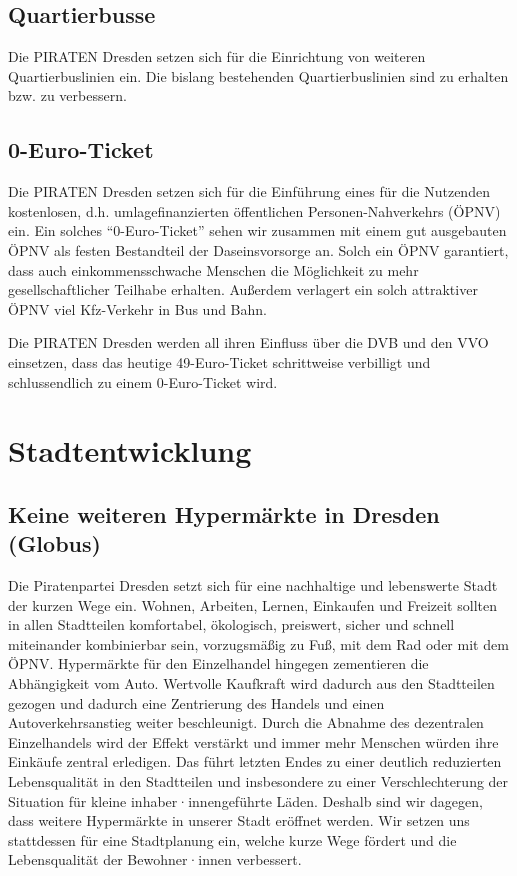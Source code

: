 \documentclass[a4paper, 11pt]{article}
\begin{document}
\subsection{Quartierbusse}
Die PIRATEN Dresden setzen sich für die Einrichtung von weiteren Quartierbuslinien ein. Die bislang bestehenden Quartierbuslinien sind zu erhalten bzw. zu verbessern.



\subsection{0-Euro-Ticket}
Die PIRATEN Dresden setzen sich für die Einführung eines für die Nutzenden kostenlosen, d.h. umlagefinanzierten öffentlichen Personen-Nahverkehrs (ÖPNV) ein. Ein solches ``0-Euro-Ticket'' sehen wir zusammen mit einem gut ausgebauten ÖPNV als festen Bestandteil der Daseinsvorsorge an. Solch ein ÖPNV garantiert, dass auch einkommensschwache Menschen die Möglichkeit zu mehr gesellschaftlicher Teilhabe erhalten. Außerdem verlagert ein solch attraktiver ÖPNV viel Kfz-Verkehr in Bus und Bahn.\newline

Die PIRATEN Dresden werden all ihren Einfluss über die DVB und den VVO einsetzen, dass das heutige 49-Euro-Ticket schrittweise verbilligt und schlussendlich zu einem 0-Euro-Ticket wird.


\section{Stadtentwicklung}

\subsection{Keine weiteren Hypermärkte in Dresden (Globus)}

Die Piratenpartei Dresden setzt sich für eine nachhaltige und lebenswerte Stadt der kurzen Wege ein. Wohnen, Arbeiten, Lernen, Einkaufen und Freizeit sollten in allen Stadtteilen komfortabel, ökologisch, preiswert, sicher und schnell miteinander kombinierbar sein, vorzugsmäßig zu Fuß, mit dem Rad oder mit dem ÖPNV. Hypermärkte für den Einzelhandel hingegen zementieren die Abhängigkeit vom Auto. Wertvolle Kaufkraft wird dadurch aus den Stadtteilen gezogen und dadurch eine Zentrierung des Handels und einen Autoverkehrsanstieg weiter beschleunigt. Durch die Abnahme des dezentralen Einzelhandels wird der Effekt verstärkt und immer mehr Menschen würden ihre Einkäufe zentral erledigen. Das führt letzten Endes zu einer deutlich reduzierten Lebensqualität in den Stadtteilen und insbesondere zu einer Verschlechterung der Situation für kleine inhaber·innengeführte Läden. Deshalb sind wir dagegen, dass weitere Hypermärkte in unserer Stadt eröffnet werden. Wir setzen uns stattdessen für eine Stadtplanung ein, welche kurze Wege fördert und die Lebensqualität der Bewohner·innen verbessert. \newline
\end{document}

